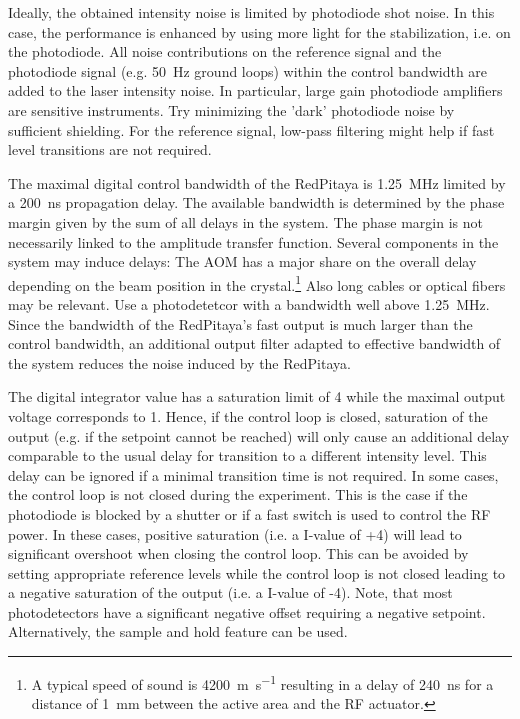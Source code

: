 \documentclass[twoside,a4paper]{refart}
\begin{document}
  

 
Ideally, the obtained intensity noise is limited by photodiode shot noise. In this case, the performance is enhanced by using more light for the stabilization, i.e. on the photodiode. All noise contributions on the reference signal and the photodiode signal (e.g. \SI{50}{\hertz} ground loops) within the control bandwidth are added to the laser intensity noise. In particular, large gain photodiode amplifiers are sensitive instruments. Try minimizing the 'dark' photodiode noise by sufficient shielding. For the reference signal, low-pass filtering might help if fast level transitions are not required.

 
The maximal digital control bandwidth of the RedPitaya is \SI{1.25}{\mega\hertz} limited by a \SI{200}{\nano\second} propagation delay. The available bandwidth is determined by the phase margin given by the sum of all delays in the system. The phase margin is not necessarily linked to the amplitude transfer function. Several components in the system may induce delays: The AOM has a major share on the overall delay depending on the beam position in the crystal.\footnote{A typical speed of sound is \SI{4200}{\meter\per\second} resulting in a delay of \SI{240}{\nano\second} for a distance of \SI{1}{\milli\meter} between the active area and the RF actuator.} Also long cables or optical fibers may be relevant. Use a photodetetcor with a bandwidth well above \SI{1.25}{\mega\hertz}. Since the bandwidth of the RedPitaya's fast output is much larger than the control bandwidth, an additional output filter adapted to effective bandwidth of the system reduces the noise induced by the RedPitaya. 

The digital integrator value has a saturation limit of 4 while the maximal output voltage corresponds to 1. Hence, if the control loop is closed, saturation of the output (e.g. if the setpoint cannot be reached) will only cause an additional delay comparable to the usual delay for transition to a different intensity level. This delay can be ignored if a minimal transition time is not required. In some cases, the control loop is not closed during the experiment. This is the case if the photodiode is blocked by a shutter or if a fast switch is used to control the RF power. In these cases, positive saturation (i.e. a I-value of +4) will lead to significant overshoot when closing the control loop. This can be avoided by setting appropriate reference levels while the control loop is not closed leading to a negative saturation of the output (i.e. a I-value of -4). Note, that most photodetectors have a significant negative offset requiring a negative setpoint. Alternatively, the sample and hold feature can be used.
 
\end{document}
